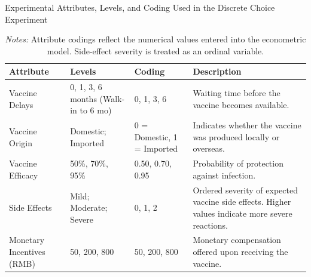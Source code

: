 \begin{table}[htbp]
\centering
\captionsetup{font=small}
\caption{Experimental Attributes, Levels, and Coding Used in the Discrete Choice Experiment}
\small
\begin{tabularx}{0.9\textwidth}{@{} l Y Y Y @{}}
\toprule
\textbf{Attribute} & \textbf{Levels} & \textbf{Coding} & \textbf{Description} \\
\midrule
Vaccine Delays &
0, 1, 3, 6 months (Walk-in to 6 mo) &
0, 1, 3, 6 &
Waiting time before the vaccine becomes available. \\

Vaccine Origin &
Domestic; Imported &
0 = Domestic, 1 = Imported &
Indicates whether the vaccine was produced locally or overseas. \\

Vaccine Efficacy &
50\%, 70\%, 95\% &
0.50, 0.70, 0.95 &
Probability of protection against infection. \\

Side Effects &
Mild; Moderate; Severe &
0, 1, 2 &
Ordered severity of expected vaccine side effects. Higher values indicate more severe reactions. \\

Monetary Incentives (RMB) &
50, 200, 800 &
50, 200, 800 &
Monetary compensation offered upon receiving the vaccine. \\
\bottomrule
\end{tabularx}

\vspace{0.25em}
\captionsetup{font=footnotesize}
\caption*{\textit{Notes:} Attribute codings reflect the numerical values entered into the econometric model. Side-effect severity is treated as an ordinal variable.}
\end{table}

